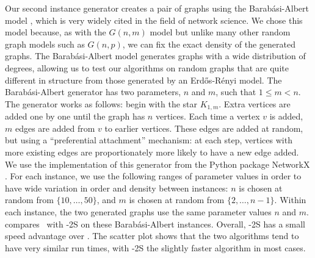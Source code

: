 Our second instance generator creates a pair of graphs using the Barabási-Albert model \citep{barabasi1999emergence},
which is very widely cited in the field of network science.
We chose this model because, as with the $G(n,m)$ model but unlike many other random graph models such
as $G(n,p)$, we can fix the exact density of the generated graphs.
The Barabási-Albert model generates graphs with a wide distribution of degrees, allowing us to test
our algorithms on random graphs that are quite different in structure from those generated by
an Erd\H{o}s-Rényi model.
The Barabási-Albert generator has two parameters, $n$ and $m$, such that
$1 \leq m < n$.  The generator works as follows: begin with the star $K_{1,m}$.
Extra vertices are added one by one until the graph has $n$ vertices.  Each time a vertex $v$ is added,
$m$ edges are added from $v$ to earlier vertices.  These edges are added at random, but using a ``preferential
attachment'' mechanism: at each step, vertices with more existing edges are proportionately more likely to have a new edge
added.  We use the implementation of this generator from the Python package NetworkX \citep{networkx}.
For each instance, we use the following ranges of parameter values in order to
have wide variation in order and density between instances: $n$ is chosen at random
from $\{10,\dots,50\}$, and $m$ is chosen at random from $\{2,\dots,n-1\}$.  Within each instance, the two
generated graphs use the same parameter values $n$ and $m$.
 compares \McSplit\ with \McSplit-2S on these Barabási-Albert instances.
Overall, \McSplit-2S has a small speed advantage over \McSplit.  The scatter plot shows that the two algorithms
tend to have very similar run times, with \McSplit-2S the slightly faster algorithm in most cases.

